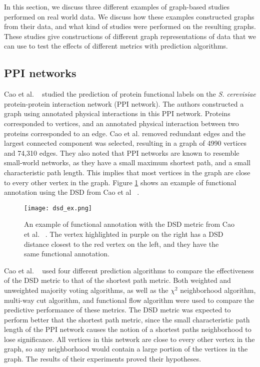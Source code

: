 In this section, we discuss three different examples of graph-based studies performed on real world data. We discuss how these examples constructed graphs from their data, and what kind of studies were performed on the resulting graphs. These studies give constructions of different graph representations of data that we can use to test the effects of different metrics with prediction algorithms.

\subsection{PPI networks}
Cao et al. ~\cite{10.1371/journal.pone.0076339} studied the prediction of protein functional labels on the \emph{S. cerevisiae} protein-protein interaction network (PPI network). The authors constructed a graph using annotated physical interactions in this PPI network. Proteins corresponded to vertices, and an annotated physical interaction between two proteins corresponded to an edge. Cao et al. removed redundant edges and the largest connected component was selected, resulting in a graph of 4990 vertices and 74,310 edges. They also noted that PPI networks are known to resemble small-world networks, as they have a small maximum shortest path, and a small characteristic path length. This implies that most vertices in the graph are close to every other vertex in the graph. Figure \ref{fig:PPI_example} shows an example of functional annotation using the DSD from Cao et al ~\cite{10.1371/journal.pone.0076339}.

\begin{figure}[h]
\centering
\texttt{[image: dsd\_ex.png]}
\caption{An example of functional annotation with the DSD metric from Cao et al. ~\cite{10.1371/journal.pone.0076339}. The vertex highlighted in purple on the right has a DSD distance closest to the red vertex on the left, and they have the same functional annotation.}
\label{fig:PPI_example}
\end{figure}

Cao et al. ~\cite{10.1371/journal.pone.0076339} used four different prediction algorithms to compare the effectiveness of the DSD metric to that of the shortest path metric. Both weighted and unweighted majority voting algorithms, as well as the $\chi^{2}$ neighborhood algorithm, multi-way cut algorithm, and functional flow algorithm were used to compare the predictive performance of these metrics. The DSD metric was expected to perform better that the shortest path metric, since the small characteristic path length of the PPI network causes the notion of a shortest paths neighborhood to lose significance. All vertices in this network are close to every other vertex in the graph, so any neighborhood would contain a large portion of the vertices in the graph. The results of their experiments proved their hypotheses.


